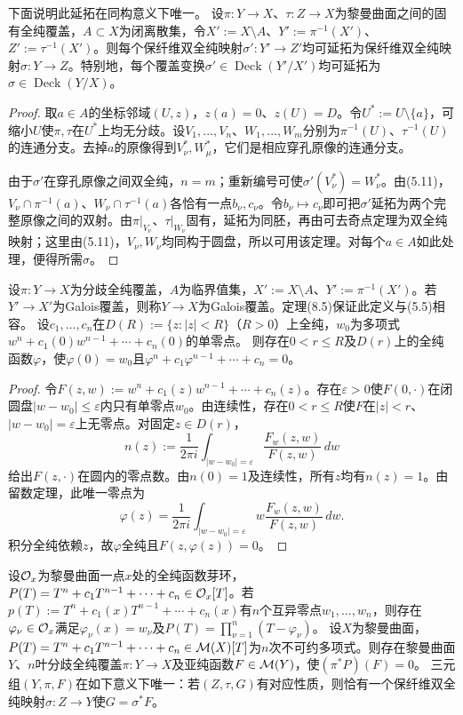 下面说明此延拓在同构意义下唯一。
设$\pi:Y\to X$、$\tau:Z\to X$为黎曼曲面之间的固有全纯覆盖，$A\subset X$为闭离散集，令$X':=X\setminus A$、$Y':=\pi^{-1}(X')$、$Z':=\tau^{-1}(X')$。则每个保纤维双全纯映射$\sigma':Y'\to Z'$均可延拓为保纤维双全纯映射$\sigma:Y\to Z$。特别地，每个覆盖变换$\sigma'\in\operatorname{Deck}(Y'/X')$均可延拓为$\sigma\in\operatorname{Deck}(Y/X)$。
\begin{proof}
取$a\in A$的坐标邻域$(U,z)$，$z(a)=0$、$z(U)=D$。令$U^*:=U\setminus\{a\}$，可缩小$U$使$\pi,\tau$在$U^*$上均无分歧。设$V_1,\ldots,V_n$、$W_1,\ldots,W_m$分别为$\pi^{-1}(U)$、$\tau^{-1}(U)$的连通分支。去掉$a$的原像得到$V_\nu^*,W_\mu^*$，它们是相应穿孔原像的连通分支。

由于$\sigma'$在穿孔原像之间双全纯，$n=m$；重新编号可使$\sigma'(V_\nu^*)=W_\nu^*$。由(5.11)，$V_\nu\cap\pi^{-1}(a)$、$W_\nu\cap\tau^{-1}(a)$各恰有一点$b_\nu,c_\nu$。令$b_\nu\mapsto c_\nu$即可把$\sigma'$延拓为两个完整原像之间的双射。由$\pi|_{V_\nu}$、$\tau|_{W_\nu}$固有，延拓为同胚，再由可去奇点定理为双全纯映射；这里由(5.11)，$V_\nu,W_\nu$均同构于圆盘，所以可用该定理。对每个$a\in A$如此处理，便得所需$\sigma$。
\end{proof}
设$\pi:Y\to X$为分歧全纯覆盖，$A$为临界值集，$X':=X\setminus A$、$Y':=\pi^{-1}(X')$。若$Y'\to X'$为Galois覆盖，则称$Y\to X$为Galois覆盖。定理(8.5)保证此定义与(5.5)相容。
设$c_1,\ldots,c_n$在$D(R):=\{z:|z|<R\}$（$R>0$）上全纯，$w_0$为多项式$w^n+c_1(0)w^{n-1}+\cdots+c_n(0)$的单零点。
则存在$0<r\le R$及$D(r)$上的全纯函数$\varphi$，使$\varphi(0)=w_0$且$\varphi^n+c_1\varphi^{n-1}+\cdots+c_n=0$。
\begin{proof}
令$F(z,w):=w^n+c_1(z)w^{n-1}+\cdots+c_n(z)$。存在$\varepsilon>0$使$F(0,\cdot)$在闭圆盘$|w-w_0|\le\varepsilon$内只有单零点$w_0$。由连续性，存在$0<r\le R$使$F$在$|z|<r$、$|w-w_0|=\varepsilon$上无零点。对固定$z\in D(r)$，
\[
n(z):=\frac1{2\pi i}\int_{|w-w_0|=\varepsilon}\frac{F_w(z,w)}{F(z,w)}\,dw
\]
给出$F(z,\cdot)$在圆内的零点数。由$n(0)=1$及连续性，所有$z$均有$n(z)=1$。由留数定理，此唯一零点为
\[
\varphi(z)=\frac1{2\pi i}\int_{|w-w_0|=\varepsilon}w\frac{F_w(z,w)}{F(z,w)}\,dw.
\]
积分全纯依赖$z$，故$\varphi$全纯且$F(z,\varphi(z))=0$。
\end{proof}
设$\mathcal O_x$为黎曼曲面一点$x$处的全纯函数芽环，$P(T)=T^n+c_1T^{n-1}+\cdots+c_n\in\mathcal O_x[T]$。若$p(T):=T^n+c_1(x)T^{n-1}+\cdots+c_n(x)$有$n$个互异零点$w_1,\ldots,w_n$，则存在$\varphi_\nu\in\mathcal O_x$满足$\varphi_\nu(x)=w_\nu$及$P(T)=\prod_{\nu=1}^n(T-\varphi_\nu)$。
设$X$为黎曼曲面，$P(T)=T^n+c_1T^{n-1}+\cdots+c_n\in\mathcal M(X)[T]$为$n$次不可约多项式。则存在黎曼曲面$Y$、$n$叶分歧全纯覆盖$\pi:Y\to X$及亚纯函数$F\in\mathcal M(Y)$，使$(\pi^*P)(F)=0$。
三元组$(Y,\pi,F)$在如下意义下唯一：若$(Z,\tau,G)$有对应性质，则恰有一个保纤维双全纯映射$\sigma:Z\to Y$使$G=\sigma^*F$。

